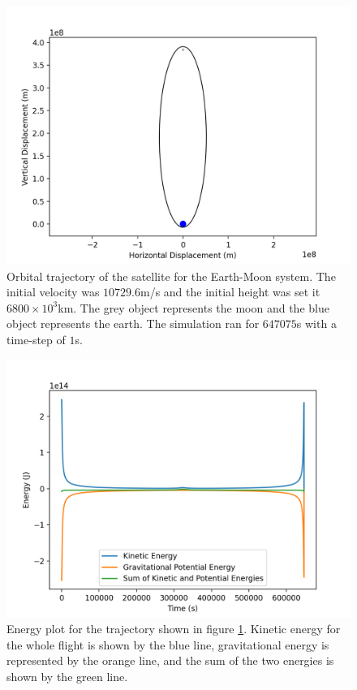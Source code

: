 \documentclass{revtex4-2}
\begin{document}
\begin{figure}
    \includegraphics[width = 0.96\linewidth]{Earth-MoonOrbit.png}
    \caption{Orbital trajectory of the satellite for the Earth-Moon system. The initial velocity was $10729.6$m/s and the initial height was set it $6800\times10^3$km. The grey object represents
        the moon and the blue object represents the earth. The simulation ran for $647075$s with a time-step of $1$s.}
    \label{SlingshotOrbit}
\end{figure}
\begin{figure}
    \includegraphics[width = 0.96\linewidth]{Earth-MoonEnergy.png}
    \caption{Energy plot for the trajectory shown in figure \ref{SlingshotOrbit}. Kinetic energy for the whole flight is shown by the blue line, gravitational energy
        is represented by the orange line, and the sum of the two energies is shown by the green line. }
    \label{SlingshotEnergy}
\end{figure}
\end{document}
